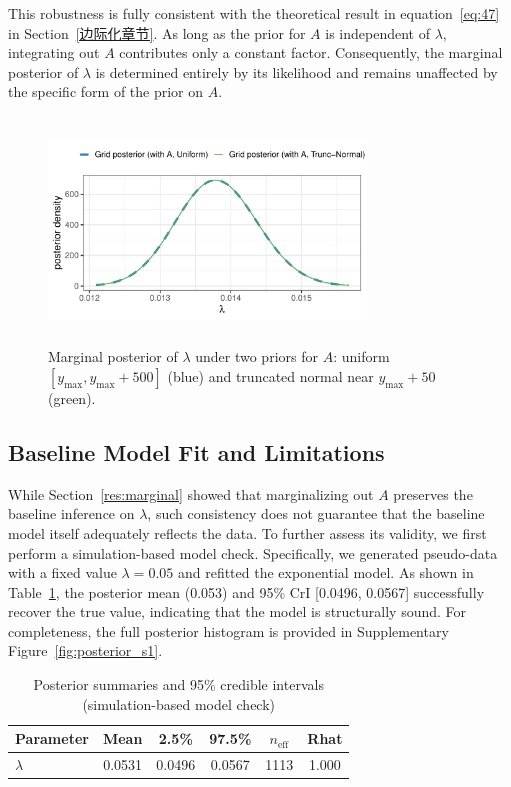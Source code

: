 This robustness is fully consistent with the theoretical result in equation~\eqref{eq:47} in Section~\ref{边际化章节}. As long as the prior for $A$ is independent of $\lambda$, integrating out $A$ contributes only a constant factor. Consequently, the marginal posterior of $\lambda$ is determined entirely by its likelihood and remains unaffected by the specific form of the prior on $A$.
\begin{figure}[H]
    \centering
    \includegraphics[height=6cm, width=0.75\textwidth]{images/diff_A_prior_marginal_compare.pdf}
    \caption{{\small Marginal posterior of $\lambda$ under two priors for $A$: uniform $[y_{\max}, y_{\max}+500]$ (blue) and truncated normal near $y_{\max}+50$ (green).}}
    \label{fig:diff_A_marginal}
\end{figure}

\subsection{Baseline Model Fit and Limitations}
\label{res:baseline_ecdf}
While Section~\ref{res:marginal} showed that marginalizing out $A$ preserves the baseline inference on $\lambda$, such consistency does not guarantee that the baseline model itself adequately reflects the data. To further assess its validity, we first perform a simulation-based model check. Specifically, we generated pseudo-data with a fixed value $\lambda=0.05$ and refitted the exponential model. As shown in Table~\ref{tab:post-ci}, the posterior mean (0.053) and 95\% CrI [0.0496, 0.0567] successfully recover the true value, indicating that the model is structurally sound. For completeness, the full posterior histogram is provided in Supplementary Figure~\ref{fig:posterior_s1}.
\begin{table}[H]
\centering
\caption{{\small Posterior summaries and 95\% credible intervals (simulation-based model check)}}
\label{tab:post-ci}
\small
\begin{tabular}{lccccc}
\toprule
{Parameter} & {Mean} & {2.5\%} & {97.5\%} & {$n_{\text{eff}}$} & {Rhat} \\
\midrule
$\lambda$   & 0.0531 & 0.0496 & 0.0567 & 1113 & 1.000 \\
\bottomrule
\end{tabular}
\end{table}

